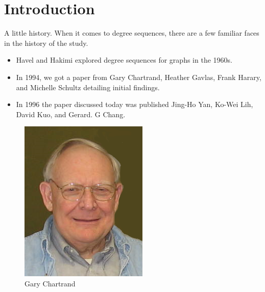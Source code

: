 \section{Introduction}


\begin{frame}{A little history.}
	When it comes to degree sequences, there are a few familiar faces in the history of the study.
		\begin{itemize}
			\item Havel and Hakimi explored degree sequences for graphs in the 1960s.
			\item In 1994, we got a paper from Gary Chartrand, Heather Gavlas, Frank Harary, and Michelle Schultz detailing initial findings.
			\item In 1996 the paper discussed today was published Jing-Ho Yan, Ko-Wei Lih, David Kuo, and Gerard. G Chang.
		\end{itemize}
\end{frame}

\begin{frame}
	\begin{figure}
		\centering 
		\includegraphics{GaryChartrand.png}
		\caption[]{Gary Chartrand}
	\end{figure}
\end{frame}



